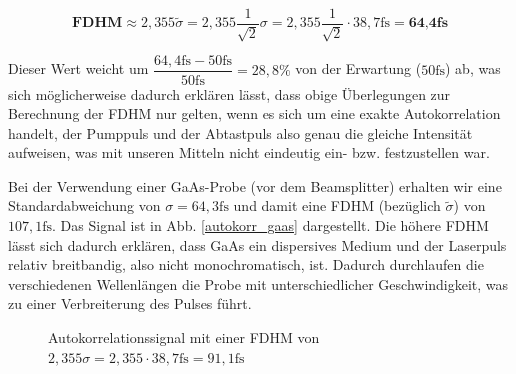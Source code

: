 \[\textbf{FDHM}\approx2,355\tilde{\sigma}=2,355\dfrac{1}{\sqrt{2}}\sigma=2,355\dfrac{1}{\sqrt{2}}\cdot 38,7\si{\femto\second}= \textbf{64,4fs}\]

Dieser Wert weicht um $\dfrac{64,4\si{\femto\second}-50\si{\femto\second}}{50\si{\femto\second}}=28,8\%$ von der Erwartung ($50\si{\femto\second}$) ab, was sich möglicherweise dadurch erklären lässt, dass obige Überlegungen zur Berechnung der FDHM nur gelten, wenn es sich um eine exakte Autokorrelation handelt, der Pumppuls und der Abtastpuls also genau die gleiche Intensität aufweisen, was mit unseren Mitteln nicht eindeutig ein- bzw. festzustellen war.

Bei der Verwendung einer GaAs-Probe (vor dem Beamsplitter) erhalten wir eine Standardabweichung von $\sigma=64,3\si{\femto\second}$ und damit eine FDHM (bezüglich $\tilde{\sigma}$) von $107,1\si{\femto\second}$. Das Signal ist in Abb. \ref{autokorr_gaas} dargestellt. Die höhere FDHM lässt sich dadurch erklären, dass GaAs ein dispersives Medium und der Laserpuls relativ breitbandig, also nicht monochromatisch, ist. Dadurch durchlaufen die verschiedenen Wellenlängen die Probe mit unterschiedlicher Geschwindigkeit, was zu einer Verbreiterung des Pulses führt.

\begin{figure}
  \centering
  \caption{Autokorrelationssignal mit einer FDHM von $2,355\sigma=2,355\cdot 38,7\si{\femto\second}=91,1\si{\femto\second}$}
  \label{autokorr_normal}
\end{figure}




